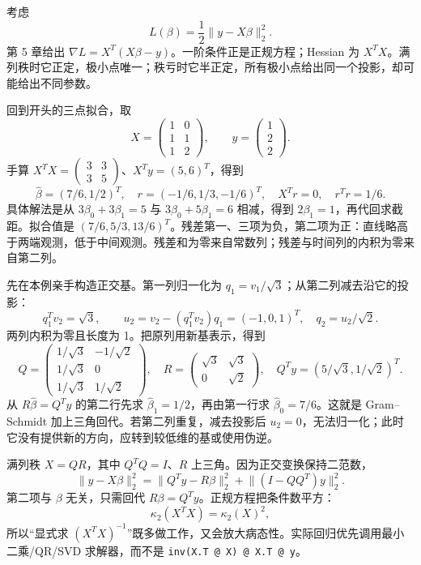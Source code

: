 考虑
\[
  L(\beta)=\frac12\lVert y-X\beta\rVert_2^2.
\]
第 5 章给出 $\nabla L=X^T(X\beta-y)$。一阶条件正是正规方程；Hessian 为 $X^TX$。满列秩时它正定，极小点唯一；秩亏时它半正定，所有极小点给出同一个投影，却可能给出不同参数。

回到开头的三点拟合，取
\[
X=\begin{pmatrix}1&0\\1&1\\1&2\end{pmatrix},\qquad
y=\begin{pmatrix}1\\2\\2\end{pmatrix}.
\]
手算 $X^TX=\left(\begin{smallmatrix}3&3\\3&5\end{smallmatrix}\right)$、$X^Ty=(5,6)^T$，得到
\[
 \hat\beta=(7/6,1/2)^T,\quad
 r=(-1/6,1/3,-1/6)^T,
 \quad X^Tr=0,\quad r^Tr=1/6.
\]
具体解法是从 $3\beta_0+3\beta_1=5$ 与 $3\beta_0+5\beta_1=6$ 相减，得到 $2\beta_1=1$，再代回求截距。拟合值是 $(7/6,5/3,13/6)^T$。残差第一、三项为负，第二项为正：直线略高于两端观测，低于中间观测。残差和为零来自常数列；残差与时间列的内积为零来自第二列。


先在本例亲手构造正交基。第一列归一化为 $q_1=v_1/\sqrt3$；从第二列减去沿它的投影：
\[
 q_1^Tv_2=\sqrt3,\qquad
 u_2=v_2-(q_1^Tv_2)q_1=(-1,0,1)^T,
 \quad q_2=u_2/\sqrt2.
\]
两列内积为零且长度为 1。把原列用新基表示，得到
\[
 Q=\begin{pmatrix}1/\sqrt3&-1/\sqrt2\\1/\sqrt3&0\\1/\sqrt3&1/\sqrt2\end{pmatrix},
 \quad R=\begin{pmatrix}\sqrt3&\sqrt3\\0&\sqrt2\end{pmatrix},
 \quad Q^Ty=(5/\sqrt3,1/\sqrt2)^T.
\]
从 $R\hat\beta=Q^Ty$ 的第二行先求 $\hat\beta_1=1/2$，再由第一行求 $\hat\beta_0=7/6$。这就是 Gram--Schmidt 加上三角回代。若第二列重复，减去投影后 $u_2=0$，无法归一化；此时它没有提供新的方向，应转到较低维的基或使用伪逆。

满列秩 $X=QR$，其中 $Q^TQ=I$、$R$ 上三角。因为正交变换保持二范数，
\[
 \lVert y-X\beta\rVert_2^2
 =\lVert Q^Ty-R\beta\rVert_2^2+\lVert (I-QQ^T)y\rVert_2^2.
\]
第二项与 $\beta$ 无关，只需回代 $R\beta=Q^Ty$。正规方程把条件数平方：
\[
 \kappa_2(X^TX)=\kappa_2(X)^2,
\]
所以“显式求 $(X^TX)^{-1}$”既多做工作，又会放大病态性。实际回归优先调用最小二乘/QR/SVD 求解器，而不是 \texttt{inv(X.T @ X) @ X.T @ y}。

